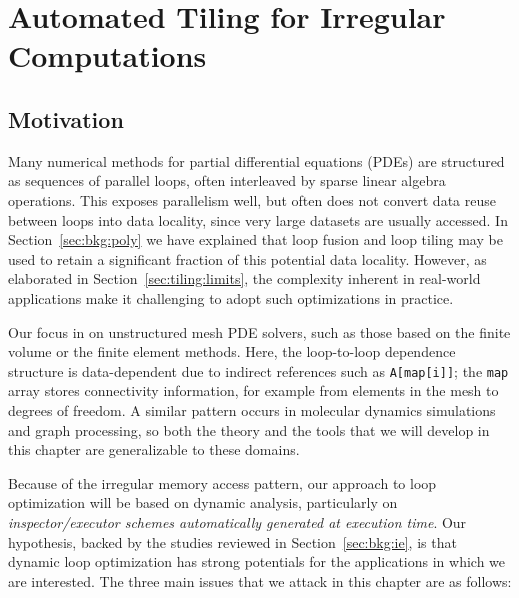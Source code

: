 \chapter{Automated Tiling for Irregular Computations}
\label{ch:sparsetiling}

\section{Motivation}
\label{sec:tiling:motivation}





Many numerical methods for partial differential equations (PDEs) are structured as sequences of parallel loops, often interleaved by sparse linear algebra operations. This exposes parallelism well, but often does not convert data reuse between loops into data locality, since very large datasets are usually accessed. In Section~\ref{sec:bkg:poly} we have explained that loop fusion and loop tiling may be used to retain a significant fraction of this potential data locality. However, as elaborated in Section~\ref{sec:tiling:limits}, the complexity inherent in real-world applications make it challenging to adopt such optimizations in practice. 

Our focus in on unstructured mesh PDE solvers, such as those based on the finite volume or the finite element methods. Here, the  loop-to-loop dependence structure is data-dependent due to
indirect references such as \texttt{A[map[i]]}; the \texttt{map} array stores connectivity information, for example from elements in the mesh to degrees of freedom. A similar pattern occurs in molecular dynamics simulations and graph processing, so both the theory and the tools that we will develop in this chapter are generalizable to these domains. 

Because of the irregular memory access pattern, our approach to loop optimization will be based on dynamic analysis, particularly on \textit{inspector/executor schemes automatically generated at execution time}. Our hypothesis, backed by the studies reviewed in Section~\ref{sec:bkg:ie}, is that dynamic loop optimization has strong potentials for the applications in which we are interested. The three main issues that we attack in this chapter are as follows:

